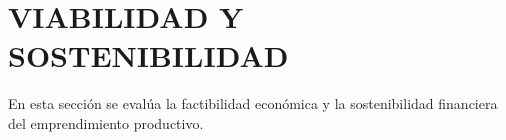 \chapter{VIABILIDAD Y SOSTENIBILIDAD}
\label{chap:viabilidad_sostenibilidad}

En esta sección se evalúa la factibilidad económica y la sostenibilidad financiera del emprendimiento productivo.




